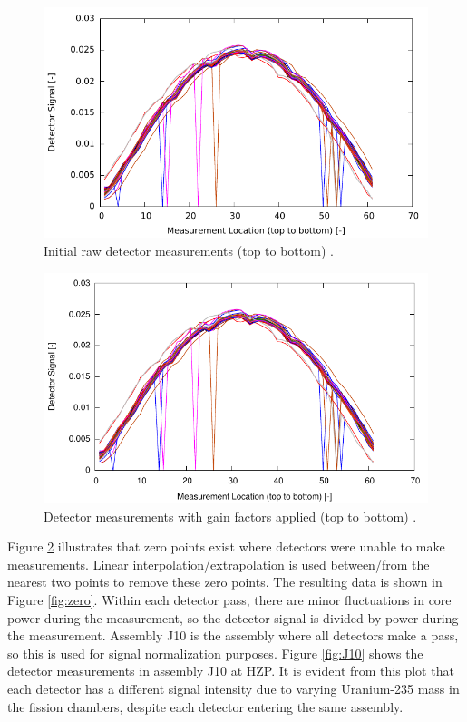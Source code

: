 \documentclass{article}
\begin{document}
\begin{figure}[!htb]
    \centering
    \includegraphics[width=4.5in]{figures/original_all.pdf}
    \caption{Initial raw detector measurements (top to bottom) \cite{beavrs}. \label{fig:orig_all}}
\end{figure}

\begin{figure}[!htb]
    \centering
    \includegraphics[width=4.5in]{figures/gain_all.pdf}
    \caption{Detector measurements with gain factors applied (top to bottom) \cite{beavrs}. \label{fig:gain_all}}
\end{figure}

Figure \ref{fig:gain_all} illustrates that zero points exist where detectors were unable to make measurements. Linear interpolation/extrapolation is used between/from the nearest two points to remove these zero points. The resulting data is shown in Figure \ref{fig:zero}. Within each detector pass, there are minor fluctuations in core power during the measurement, so the detector signal is divided by power during the measurement. Assembly J10 is the assembly where all detectors make a pass, so this is used for signal normalization purposes. Figure \ref{fig:J10} shows the detector measurements in assembly J10 at HZP. It is evident from this plot that each detector has a different signal intensity due to varying Uranium-235 mass in the fission chambers, despite each detector entering the same assembly. 
\end{document}
